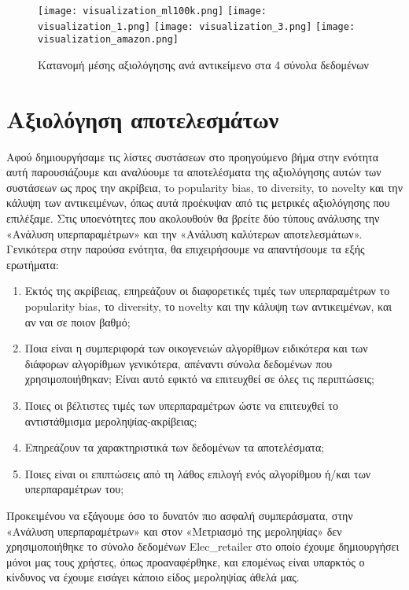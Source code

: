 \begin{figure}[htp]
	\vspace{0.00mm}
	\centering
	\texttt{[image: visualization\_ml100k.png]}
	\vspace{-0.20mm}
		\texttt{[image: visualization\_1.png]}
		\texttt{[image: visualization\_3.png]}
			\texttt{[image: visualization\_amazon.png]}
	\caption{Κατανομή μέσης αξιολόγησης ανά αντικείμενο στα 4 σύνολα δεδομένων}
	\label{fig:density}
\end{figure}


\newpage
\section{Αξιολόγηση αποτελεσμάτων}
\noindent Αφού δημιουργήσαμε τις λίστες συστάσεων στο προηγούμενο βήμα στην ενότητα αυτή παρουσιάζουμε και αναλύουμε τα αποτελέσματα της αξιολόγησης αυτών των συστάσεων ως προς την ακρίβεια, τo popularity bias, το diversity, το novelty και την κάλυψη των αντικειμένων, όπως αυτά προέκυψαν από τις μετρικές αξιολόγησης που επιλέξαμε. Στις υποενότητες που ακολουθούν θα βρείτε δύο τύπους ανάλυσης την «Ανάλυση υπερπαραμέτρων» και την «Ανάλυση καλύτερων αποτελεσμάτων». Γενικότερα στην παρούσα ενότητα, θα επιχειρήσουμε να απαντήσουμε τα εξής ερωτήματα:
\begin{enumerate}
	\item Εκτός της ακρίβειας, επηρεάζουν οι διαφορετικές τιμές των υπερπαραμέτρων το popularity bias, το diversity, το novelty και την κάλυψη των αντικειμένων, και αν ναι σε ποιον βαθμό;
	\item Ποια είναι η συμπεριφορά των οικογενειών αλγορίθμων ειδικότερα και των διάφορων αλγορίθμων γενικότερα, απέναντι σύνολα δεδομένων που χρησιμοποιήθηκαν; Είναι αυτό εφικτό να επιτευχθεί σε όλες τις περιπτώσεις;
	\item Ποιες οι βέλτιστες τιμές των υπερπαραμέτρων ώστε να επιτευχθεί το αντιστάθμισμα μεροληψίας-ακρίβειας;
	\item Επηρεάζουν τα χαρακτηριστικά των δεδομένων τα αποτελέσματα;
	\item Ποιες είναι οι επιπτώσεις από τη λάθος επιλογή ενός αλγορίθμου ή/και των υπερπαραμέτρων του;
	
\end{enumerate}
\noindent Προκειμένου να εξάγουμε όσο το δυνατόν πιο ασφαλή συμπεράσματα, στην «Ανάλυση υπερπαραμέτρων» και στον «Μετριασμό της μεροληψίας» δεν χρησιμοποιήθηκε το σύνολο δεδομένων Elec\_retailer στο οποίο έχουμε δημιουργήσει μόνοι μας τους χρήστες, όπως προαναφέρθηκε, και επομένως είναι υπαρκτός ο κίνδυνος να έχουμε εισάγει κάποιο είδος μεροληψίας άθελά μας.
